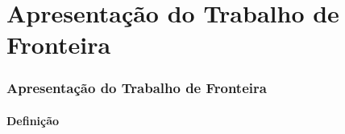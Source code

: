 %
%
%
%

\part{Apresentação do Trabalho de Fronteira}
\frame{\partpage}

\section{Apresentação do Trabalho de Fronteira}

\subsection{Definição}

